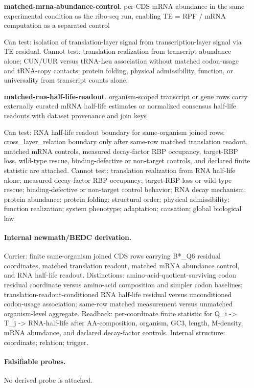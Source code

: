 \textbf{matched-mrna-abundance-control}. per-CDS mRNA abundance in the same experimental condition as the ribo-seq run, enabling TE = RPF / mRNA computation as a separated control

Can test: isolation of translation-layer signal from transcription-layer signal via TE residual. Cannot test: translation realization from transcript abundance alone; CUN/UUR versus tRNA-Leu association without matched codon-usage and tRNA-copy contacts; protein folding, physical admissibility, function, or universality from transcript counts alone.

\textbf{matched-rna-half-life-readout}. organism-scoped transcript or gene rows carry externally curated mRNA half-life estimates or normalized consensus half-life readouts with dataset provenance and join keys

Can test: RNA half-life readout boundary for same-organism joined rows; cross\_layer\_relation boundary only after same-row matched translation readout, matched mRNA controls, measured decay-factor RBP occupancy, target-RBP loss, wild-type rescue, binding-defective or non-target controls, and declared finite statistic are attached. Cannot test: translation realization from RNA half-life alone; measured decay-factor RBP occupancy; target-RBP loss or wild-type rescue; binding-defective or non-target control behavior; RNA decay mechanism; protein abundance; protein folding; structural order; physical admissibility; function realization; system phenotype; adaptation; causation; global biological law.

\paragraph{Internal newmath/BEDC derivation.} Carrier: finite same-organism joined CDS rows carrying B*\_Q6 residual coordinates, matched translation readout, matched mRNA abundance control, and RNA half-life readout. Distinctions: amino-acid-quotient-surviving codon residual coordinate versus amino-acid composition and simpler codon baselines; translation-readout-conditioned RNA half-life residual versus unconditioned codon-usage association; same-row matched measurement versus unmatched organism-level aggregate. Readback: per-coordinate finite statistic for Q\_i -> T\_j -> RNA-half-life after AA-composition, organism, GC3, length, M-density, mRNA abundance, and declared decay-factor controls. Internal structure: coordinate; relation; trigger.

\paragraph{Falsifiable probes.}
No derived probe is attached.

